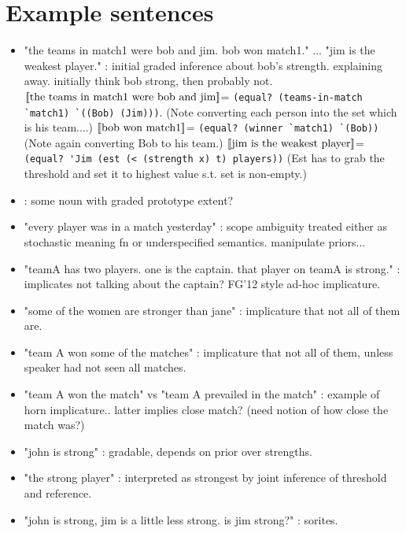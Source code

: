 \documentclass[12pt]{article}
\newcommand{\llbracket}{\ensuremath{\left [\!\left [}}%
\newcommand{\rrbracket}{\ensuremath{\right ]\!\right ]}}
\providecommand{\textsv}[1]{\ensuremath{\llbracket \text{#1} \rrbracket}}
\begin{document}
\section{Example sentences}
\begin{itemize}
\item "the teams in match1 were bob and jim. bob won match1." ... "jim is the weakest player." : initial graded inference about bob's strength. explaining away. initially think bob strong, then probably not.
\subitem \textsv{the teams in match1 were bob and jim}= \lstinline{(equal? (teams-in-match `match1) `((Bob) (Jim)))}. (Note converting each person into the set which is his team....)
\subitem \textsv{bob won match1}= \lstinline{(equal? (winner `match1) `(Bob))} (Note again converting Bob to his team.)
\subitem \textsv{jim is the weakest player}= \lstinline{(equal? 'Jim (est (< (strength x) t) players))}  (Est has to grab the threshold and set it to highest value s.t. set is non-empty.) 


\item : some noun with graded  prototype extent?
\item "every player was in a match yesterday" : scope ambiguity treated either as stochastic meaning fn or underspecified semantics. manipulate priors...
\item "teamA has two players. one is the captain. that player on teamA is strong." : implicates not talking about the captain?  FG'12 style ad-hoc implicature.
\item "some of the women are stronger than jane" : implicature that not all of them are.
\item "team A won some of the matches" : implicature that not all of them, unless speaker had not seen all matches.
\item "team A won the match" vs "team A prevailed in the match" : example of horn implicature.. latter implies close match? (need notion of how close the match was?)
\item "john is strong" : gradable, depends on prior over strengths.
\item "the strong player" : interpreted as strongest by joint inference of threshold and reference.
\item "john is strong, jim is a little less strong. is jim strong?" : sorites.
\end{itemize}
\end{document}
